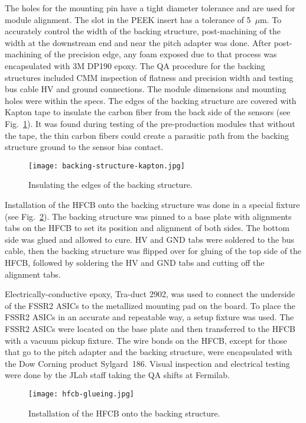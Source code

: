 The holes for the mounting pin have a tight diameter tolerance and are used for module alignment. The slot in the PEEK insert has a tolerance of 5~$\mu$m. To accurately control the width of the backing structure, post-machining of the width at the downstream end and near the pitch adapter was done. After post-machining of the precision edge, any foam exposed due to that process was encapsulated with 3M DP190 epoxy. The QA procedure for the backing structures included CMM inspection of flatness and precision width and testing bus cable HV and ground connections. The module dimensions and mounting holes were within the specs. The edges of the backing structure are covered with Kapton tape to insulate the carbon fiber from the back side of the sensors (see Fig.~\ref{fig:backing-structure-kapton}). It was found during testing of the pre-production modules that without the tape, the thin carbon fibers could create a parasitic path from the backing structure ground to the sensor bias contact.

\begin{figure}[h] 
\centering 
\texttt{[image: backing-structure-kapton.jpg]}
\caption{Insulating the edges of the backing structure.}
\label{fig:backing-structure-kapton}
\end{figure}

Installation of the HFCB onto the backing structure was done in a special fixture (see Fig.~\ref{fig:hfcb-glueing}). The backing structure was pinned to a base plate with alignments tabs on the HFCB to set its position and alignment of both sides. The bottom side was glued and allowed to cure. HV and GND tabs were soldered to the bus cable, then the backing structure was flipped over for gluing of the top side of the HFCB, followed by soldering the HV and GND tabs and cutting off the alignment tabs. 

Electrically-conductive epoxy, Tra-duct 2902, was used to connect the underside of the FSSR2 ASICs to the metallized mounting pad on the board. To place the FSSR2 ASICs in an accurate and repeatable way, a setup fixture was used. The FSSR2 ASICs were located on the base plate and then transferred to the HFCB with a vacuum pickup fixture. The wire bonds on the HFCB, except for those that go to the pitch adapter and the backing structure, were encapsulated with the Dow Corning product Sylgard~186. Visual inspection and electrical testing were done by the JLab staff taking the QA shifts at Fermilab.

\begin{figure}[h] 
\centering 
\texttt{[image: hfcb-glueing.jpg]}
\caption{Installation of the HFCB onto the backing structure.}
\label{fig:hfcb-glueing}
\end{figure}

